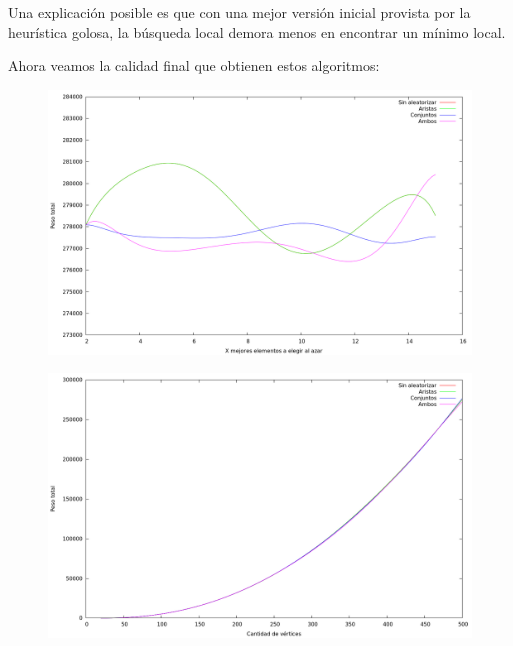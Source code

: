 Una explicación posible es que con una mejor versión inicial provista por
la heurística golosa, la búsqueda local demora menos en encontrar un mínimo
local.

Ahora veamos la calidad final que obtienen estos algoritmos:

\vspace*{0.5cm}

\begin{figure}[H]
  \begin{center}
    \includegraphics[scale=0.35]{imagenes/grasp-local-x-peso.png}
  \end{center}
\end{figure}

\vspace*{0.5cm}

\vspace*{0.5cm}

\begin{figure}[H]
  \begin{center}
    \includegraphics[scale=0.35]{imagenes/grasp-local-n-peso.png}
  \end{center}
\end{figure}

